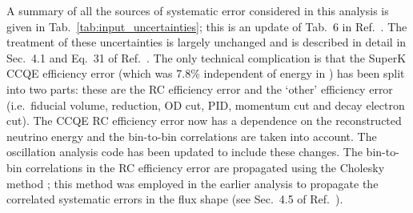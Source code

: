 A summary of all the sources of systematic error considered in this
analysis is given in Tab.\ \ref{tab:input_uncertainties}; this is an
update of Tab.\ 6 in Ref.\ \cite{OurRun1DisappAnalysis}.
The treatment of these uncertainties is largely unchanged and is
described in detail in Sec.\ 4.1 and Eq.\ 31 of Ref.\ \cite{OurRun1DisappAnalysis}. 
The only technical complication is that the SuperK
CCQE efficiency error (which was 7.8\% independent of energy in
\cite{OurRun1DisappAnalysis}) 
has been split into two parts: these are the RC efficiency error and the
`other' efficiency error (i.e.\ fiducial volume, reduction, OD cut, PID, momentum cut and decay
electron cut). The CCQE RC efficiency
error now has a dependence on the reconstructed
neutrino energy and the bin-to-bin correlations are taken into account.
The oscillation analysis code has been updated to include these changes.
The bin-to-bin correlations in the RC efficiency error are propagated using the Cholesky 
method \cite{NumRecipCholesky}; this method was employed in the earlier analysis to propagate
the correlated systematic errors in the flux shape (see Sec.\ 4.5 of Ref.\ \cite{OurRun1DisappAnalysis}).

%
%

